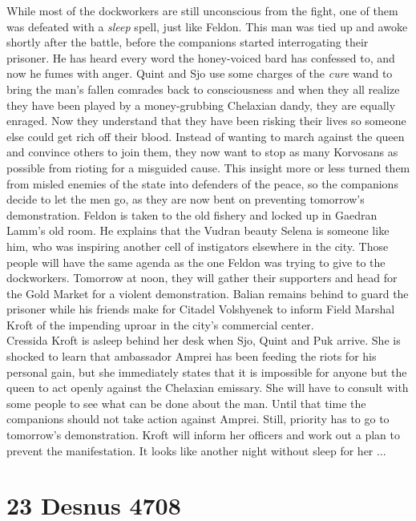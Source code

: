 While most of the dockworkers are still unconscious from the fight, one of them was defeated with a {\itshape sleep} spell, just like Feldon. This man was tied up and awoke shortly after the battle, before the companions started interrogating their prisoner. He has heard every word the honey-voiced bard has confessed to, and now he fumes with anger. Quint and Sjo use some charges of the  {\itshape cure} wand to bring the man's fallen comrades back to consciousness and when they all realize they have been played by a money-grubbing Chelaxian dandy, they are equally enraged. Now they understand that they have been risking their lives so someone else could get rich off their blood. Instead of wanting to march against the queen and convince others to join them, they now want to stop as many Korvosans as possible from rioting for a misguided cause. This insight more or less turned them from misled enemies of the state into defenders of the peace, so the companions decide to let the men go, as they are now bent on preventing tomorrow's demonstration. Feldon is taken to the old fishery and locked up in Gaedran Lamm's old room. He explains that the Vudran beauty Selena is someone like him, who was inspiring another cell of instigators elsewhere in the city. Those people will have the same agenda as the one Feldon was trying to give to the dockworkers. Tomorrow at noon, they will gather their supporters and head for the Gold Market for a violent demonstration. Balian remains behind to guard the prisoner while his friends make for Citadel Volshyenek to inform Field Marshal Kroft of the impending uproar in the city's commercial center.\\

Cressida Kroft is asleep behind her desk when Sjo, Quint and Puk arrive. She is shocked to learn that ambassador Amprei has been feeding the riots for his personal gain, but she immediately states that it is impossible for anyone but the queen to act openly against the Chelaxian emissary. She will have to consult with some people to see what can be done about the man. Until that time the companions should not take action against Amprei. Still, priority has to go to tomorrow's demonstration. Kroft will inform her officers and work out a plan to prevent the manifestation. It looks like another night without sleep for her ...\\

\section{23 Desnus 4708}

